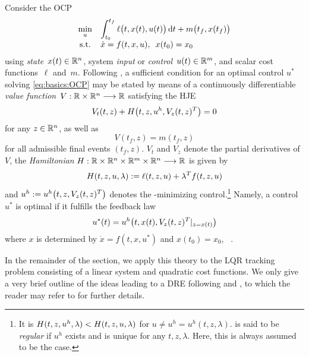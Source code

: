 Consider the \ac{OCP}
\begin{equation}
  \everymath{\displaystyle}
  \begin{array}{cl}
    \min_u & \int_{t_0}^{t_f} \ell\big(t, x(t), u(t)\big) \dt + m\big(t_f, x(t_f)\big) \\
    \text{s.t.} & \dot{x} = f(t,x,u), \enspace x(t_0) = x_0
  \end{array}
  \label{eq:basics:OCP}
\end{equation}
using \emph{state}~$x(t)\in\mathbb{R}^n$, system \emph{input} or \emph{control}~$u(t)\in\mathbb{R}^m$,
and scalar cost functions~$\ell$ and~$m$.
Following \cite{Locatelli2011},
a sufficient condition for
an optimal control $u^*$ solving \eqref{eq:basics:OCP} may be stated by means of a
continuously differentiable
\emph{value function}~$V:\mathbb{R}\times\mathbb{R}^n\longrightarrow\mathbb{R}$ satisfying the \ac{HJE}
\begin{equation}
  V_t(t,z) + H\big(t,z,u^h,V_z(t,z)^T \big) = 0
  \label{eq:basics:HJE}
\end{equation}
for any $z\in\mathbb{R}^n$,
as well as
\begin{equation}
  V(t_f,z) = m(t_f,z)
  \label{eq:basics:HJE:condition}
\end{equation}
for all admissible final events $(t_f,z)$.
$V_t$ and $V_z$ denote the partial derivatives of $V$,
the \emph{Hamiltonian} $H:\mathbb{R}\times\mathbb{R}^n\times\mathbb{R}^m\times\mathbb{R}^n\longrightarrow\mathbb{R}$ is given by
\begin{equation}
\label{eq:basics:Hamiltonian}
  H(t,z,u,\lambda) := \ell(t,z,u) + \lambda^T f(t,z,u)
\end{equation}
and $u^h := u^h\big(t,z,V_z(t, z)^T\big)$ denotes the \Ham-minimizing control.\footnote{%
  It is $H(t, z, u^h, \lambda) < H(t, z, u, \lambda)$ for $u \neq u^h = u^h(t, z, \lambda)$.
  \Ham{} is said to be \emph{regular} if $u^h$ exists and is unique for any $t, z, \lambda$.
  Here, this is always assumed to be the case.
}
Namely, a control $u^*$ is optimal if it fulfills the feedback law
\begin{equation}
\label{eq:basics:HJ:feedback}
  u^*(t) = u^h\big(t, x(t), V_z(t,z)^T |_{z=x(t)} \big)
\end{equation}
where $x$ is determined by $\dot x = f(t, x, u^*)$ and $x(t_0) = x_0$,
\cf~\cite[Corollary~2.1]{Locatelli2011}.

In the remainder of the section,
we apply this theory to the \ac{LQR} tracking problem
consisting of a linear system and quadratic cost functions.
We only give a very brief outline of the ideas leading to a \ac{DRE}
following \cite[Remarks~3.3 and~3.6]{Locatelli2011} and \cite[Section~3.2.2]{Lang2017},
to which the reader may refer to for further details.

